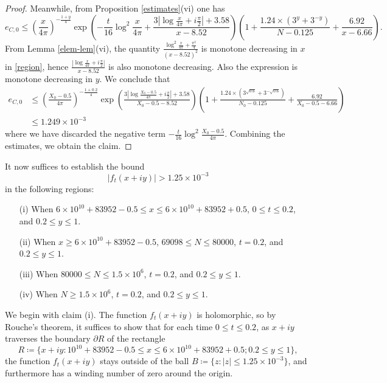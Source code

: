 \begin{proof}
Meanwhile, from Proposition \ref{estimates}(vi) one has
$$ e_{C,0} \leq \left(\frac{x}{4\pi}\right)^{-\frac{1+y}{4}} \exp\left( - \frac{t}{16} \log^2 \frac{x}{4\pi} + \frac{3 |\log \frac{x}{4\pi} + i \frac{\pi}{2}|+3.58}{x-8.52} \right) \left(1 + \frac{1.24 \times (3^y+3^{-y})}{N-0.125} + \frac{6.92}{x-6.66}\right).$$
From Lemma \ref{elem-lem}(vi), the quantity $\frac{\log^2 \frac{x}{4\pi} + \frac{\pi^2}{4}}{(x-8.52)^2}$ is monotone decreasing in $x$ in \eqref{region}, hence $\frac{|\log \frac{x}{4\pi} + i \frac{\pi}{2}|}{x-8.52}$ is also monotone decreasing.  Also the expression is monotone decreasing in $y$. We conclude that
\begin{equation}\label{ec0-bound}
\begin{split}
 e_{C,0} &\leq \left(\frac{X_0-0.5}{4\pi}\right)^{-\frac{1+0.2}{4}} \exp\left( \frac{3 |\log \frac{X_0-0.5}{4\pi} + i \frac{\pi}{2}|+3.58}{X_0-0.5-8.52} \right) \left(1 + \frac{1.24 \times (3^{\sqrt{0.6}}+3^{-\sqrt{0.6}})}{N_0-0.125} + \frac{6.92}{X_0-0.5-6.66}\right) \\
&\leq 1.249 \times 10^{-3}
\end{split}
\end{equation}
where we have discarded the negative term $- \frac{t}{16} \log^2 \frac{X_0-0.5}{4\pi}$.  Combining the estimates, we obtain the claim.
\end{proof}


It now suffices to establish the bound
\begin{equation}\label{ft0}
 |f_t(x+iy)| > 1.25 \times 10^{-3}
\end{equation}
in the following regions:

\begin{itemize}
\item[(i)]  When $6 \times 10^{10} + 83952 - 0.5 \leq x \leq 6 \times 10^{10} + 83952 + 0.5$, $0 \leq t \leq 0.2$, and $0.2 \leq y \leq 1$.
\item[(ii)]  When $x \geq 6 \times 10^{10} + 83952 - 0.5$, $69098 \leq N \leq 80000$, $t = 0.2$, and $0.2 \leq y \leq 1$.
\item[(iii)]  When $80000 \leq N \leq 1.5 \times 10^6$, $t = 0.2$, and $0.2 \leq y \leq 1$.
\item[(iv)]  When $N \geq 1.5 \times 10^6$, $t = 0.2$, and $0.2 \leq y \leq 1$.
\end{itemize}


We begin with claim (i).  The function $f_t(x+iy)$ is holomorphic, so by Rouche's theorem, it suffices to show that for each time $0 \leq t \leq 0.2$, as $x+iy$ traverses the boundary $\partial R$ of the rectangle 
$$ R \coloneqq \{ x+iy: 10^{10} + 83952 - 0.5 \leq x \leq 6 \times 10^{10} + 83952 + 0.5; 0.2 \leq y \leq 1 \},$$
the function $f_t(x+iy)$ stays outside of the ball $B \coloneqq \{ z: |z| \leq 1.25 \times 10^{-3} \}$, and furthermore has a winding number of zero around the origin.

